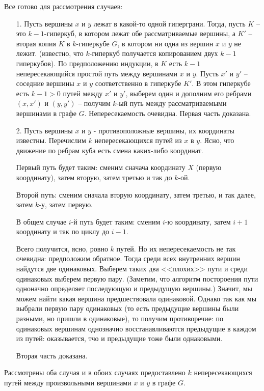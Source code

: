 \documentclass[russian]{article}
\begin{document}
Все готово для рассмотрения случаев:
\begin{enumerate}
 \item[1.] Пусть вершины $x$ и $y$ лежат в какой-то одной гиперграни. Тогда, пусть $K$ -- это $k-1$-гиперкуб, в котором лежат обе рассматриваемые вершины, а $K'$ -- вторая копия $K$ в $k$-гиперкубе  $G$, в котором ни одна из вершин $x$ и $y$ не лежит. (известно, что $k$-гиперкуб получается копированием двух $k-1$ гиперкубов).
 По предположению индукции, в $K$ есть $k-1$ непересекающийся простой путь между вершинами $x$ и $y$. Пусть $x'$ и $y'$ -- соседние вершины $x$ и $y$ соответственно в гиперкубе $K'$. В этом гиперкубе есть $k-1>0$ путей между $x'$ и $y'$, выберем один и дополним его ребрами $(x,x')$ и $(y,y')$ -- получим $k$-ый путь между рассматриваемыми вершинами в графе $G$. Непересекаемость очевидна. Первая часть доказана.
 
  \item[2.] Пусть вершины $x$ и $y$ - противоположные вершины, их координаты известны. Перечислим $k$ непересекающихся путей из $x$ в $y$. Ясно, что движение по ребрам куба есть смена каких-либо координат.
    
  Первый путь будет таким: сменим сначача координату $X$ (первую координату), затем вторую, затем третью и так до $k$-ой.
    
  Второй путь: сменим сначала вторую координату, затем третью, и так далее, затем $k$-у, затем первую.
  
  В общем случае $i$-й путь будет таким: сменим $i$-ю координату, затем $i+1$ координату и так по циклу до $i-1$.
    
  Всего получится, ясно, ровно $k$ путей. Но их непересекаемость не так очевидна: предположим обратное. Тогда среди всех внутренних вершин найдутся две одинаковых. Выберем таких два <<плохих>> пути и среди одинаковых выберем первую пару. (Заметим, что алгоритм постороения пути одноначно определяет последующую и предыдущую вершины.) Значит, мы можем найти какая вершина предшествовала одинаковой. Однако так как мы выбрали первую пару одинаковых (то есть предыдущие вершины были разными, но пришли в одинаковые), то получим противоречие: по одинаковых вершинам однозначно восстанавливаются предыдущие в каждом из путей: оказывается, тчо и предыдущие тоже были однаковыми.
  
  Вторая часть доказана.
\end{enumerate} 

Рассмотрены оба случая и в обоих случаях предоставлено $k$ непересекающихся путей между произвольными вершинами $x$ и $y$ в графе $G$.
\end{document}
